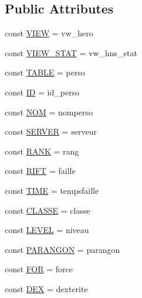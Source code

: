 \subsection*{Public Attributes}
\begin{DoxyCompactItemize}
\item 
const \hyperlink{class_hero_ad2cf847e53c8fe77bafcd0402a56335b}{V\+I\+EW} = \textquotesingle{}vw\+\_\+hero\textquotesingle{}
\item 
const \hyperlink{class_hero_a89472a268f641ef6610db1c90fb239af}{V\+I\+E\+W\+\_\+\+S\+T\+AT} = \textquotesingle{}vw\+\_\+hns\+\_\+stat\textquotesingle{}
\item 
const \hyperlink{class_hero_a8d9eaf8f96fa6331b9a02388c9a4ccfb}{T\+A\+B\+LE} = \textquotesingle{}perso\textquotesingle{}
\item 
const \hyperlink{class_hero_a34e910a3350b6c60783b2d14ed59deb5}{ID} = \textquotesingle{}id\+\_\+perso\textquotesingle{}
\item 
const \hyperlink{class_hero_a990363ff56776461c08d1e5fc6731176}{N\+OM} = \textquotesingle{}nomperso\textquotesingle{}
\item 
const \hyperlink{class_hero_ae65c017ecc28b2d2f913a990b1c69ed3}{S\+E\+R\+V\+ER} = \textquotesingle{}serveur\textquotesingle{}
\item 
const \hyperlink{class_hero_a8bdfca716a1fc6780b5989b950866b4a}{R\+A\+NK} = \textquotesingle{}rang\textquotesingle{}
\item 
const \hyperlink{class_hero_a36e3c3c61f8c94e7120bd3067bf4559f}{R\+I\+FT} = \textquotesingle{}faille\textquotesingle{}
\item 
const \hyperlink{class_hero_ac567982b8c3e995a07db079d054b5c69}{T\+I\+ME} = \textquotesingle{}tempsfaille\textquotesingle{}
\item 
const \hyperlink{class_hero_a261b3cd95f444add0efb50d0fce447fb}{C\+L\+A\+S\+SE} = \textquotesingle{}classe\textquotesingle{}
\item 
const \hyperlink{class_hero_ae811e1aee75710f93c27be7ab58ec127}{L\+E\+V\+EL} = \textquotesingle{}niveau\textquotesingle{}
\item 
const \hyperlink{class_hero_a8638ccc74f66a3fbebfe14758e019067}{P\+A\+R\+A\+N\+G\+ON} = \textquotesingle{}parangon\textquotesingle{}
\item 
const \hyperlink{class_hero_a6e327c17f3ea677e5ad68061be4066f6}{F\+OR} = \textquotesingle{}force\textquotesingle{}
\item 
const \hyperlink{class_hero_a15a42da90fc7710dd1877d70e0485843}{D\+EX} = \textquotesingle{}dexterite\textquotesingle{}

\end{DoxyCompactItemize}
